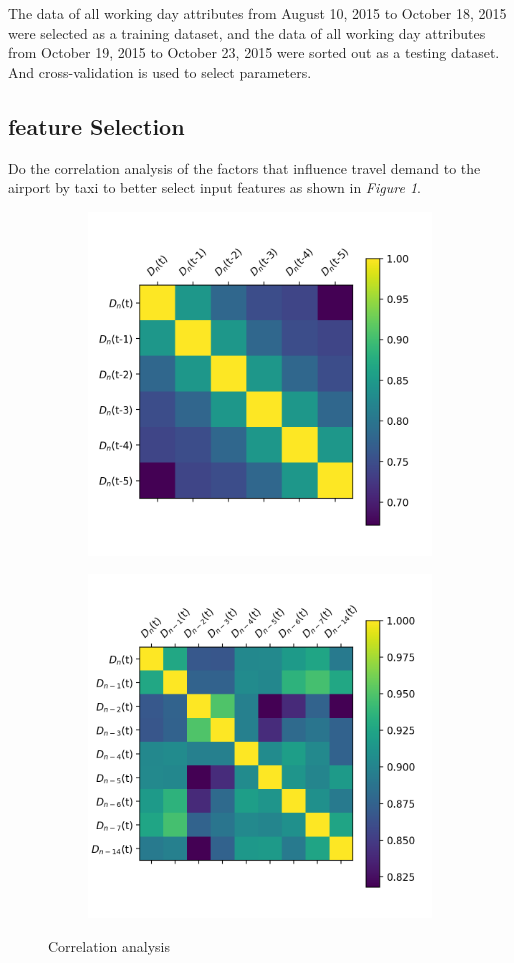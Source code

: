 \documentclass[sigconf]{acmart}
\begin{document}
The data of all working day attributes from August 10, 2015 to October 18, 2015 were selected as a training dataset, and the data of all working day attributes from October 19, 2015 to October 23, 2015 were sorted out as a testing dataset. And cross-validation is used to select parameters.
\subsection{feature Selection}
Do the correlation analysis of the factors that influence travel demand to the airport by taxi
to better select input features as shown in \textit{Figure 1}.
\begin{figure}[ht]
  \begin{subfigure}{.5\textwidth}
    \centering
    \includegraphics[width=.8\linewidth]{correlation_analysis1}  
  \end{subfigure}
  \begin{subfigure}{.5\textwidth}
    \centering
    \includegraphics[width=.8\linewidth]{correlation_analysis2}  
  \end{subfigure}
  \caption{Correlation analysis}
  \end{figure}
\end{document}
